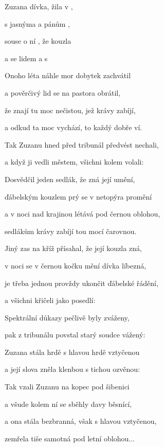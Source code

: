 

\zs
Zuzana  dívka,  žila v ,

s jasnýma  a  pánům ,

souse o ní , že  kouzla 

a  se lidem  a s   
\ks

\zs
Onoho léta náhle mor dobytek zachvátil

a pověrčivý lid se na pastora obrátil,

že znají tu moc nečistou, jež krávy zabíjí,

a odkud ta moc vychází, to každý dobře ví.
\ks

\zs
Tak Zuzanu hned před tribunál předvést nechali,

a když ji vedli městem, všichni kolem volali:

\ks

\zs
Dosvědčil jeden sedlák, že zná její umění,

ďábelským kouzlem prý se v netopýra promění

a v noci nad krajinou létává pod černou oblohou,

sedlákům krávy zabíjí tou mocí čarovnou.
\ks

\zs
Jiný zas na kříž přísahal, že její kouzla zná,

v noci se v černou kočku mění dívka líbezná,

je třeba jednou provždy ukončit ďábelské řádění,

a všichni křičeli jako posedlí: 
\ks

\zs
Spektrální důkazy pečlivě byly zváženy,

pak z tribunálu povstal starý soudce vážený:

\ks

\zs
Zuzana stála hrdě s hlavou hrdě vztyčenou

a její slova zněla klenbou s tichou ozvěnou:

\ks

\zs
Tak vzali Zuzanu na kopec pod šibenici

a všude kolem ní se sběhly davy běsnící,

a ona stála bezbranná, však s hlavou vztyčenou,

zemřela tiše samotná pod letní oblohou...
\ks

\kp























